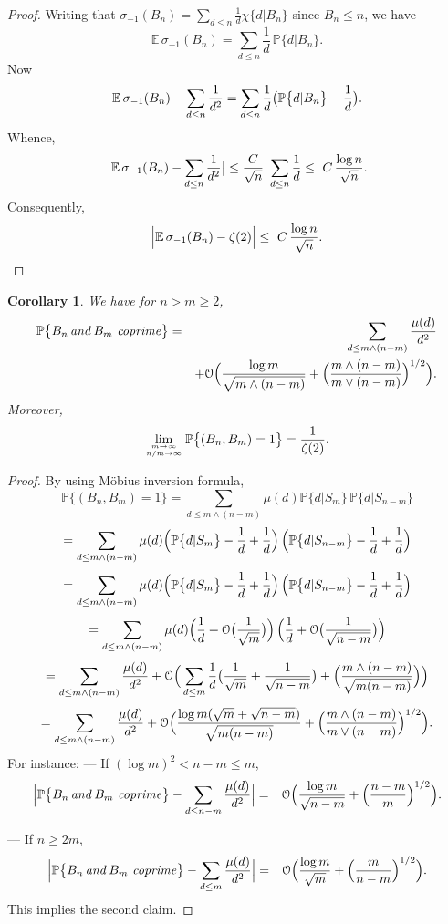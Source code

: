 \documentclass[11pt,draft,reqno]{amsart}
\newtheorem{corollary}[theorem]{Corollary}
\theoremstyle{definition}
\theoremstyle{remarks}
\numberwithin{equation}{section}
\def \m{{\mu}}
\def \s{{\sigma}}
\def\P{{\mathcal P}}
\def\E{{\mathbb E \,}}
\def\P{{\mathbb P}}
\begin{document}
\begin{proof}Writing that $\s_{-1}(B_n)=\sum_{d\le n }\frac{1}{d}\chi\{d|B_n\}$ since $B_n\le n$, we have 
$$  \E \s_{-1}(B_n)= \sum_{d\le n }\frac{1}{d}\,\P\{d|B_n\}.  $$
Now $$\E \s_{-1}(B_n)- \sum_{d\le n}{1\over d^2}=
\sum_{d\le n}{1\over d}\big( \P\big\{d|B_n\big\}  - {1\over d }\big). $$
Whence,
$$\big|\E \s_{-1}(B_n)- \sum_{d\le n}{1\over d^2}\big|\le
{C \over\sqrt n}\ \sum_{d\le n}{1\over d}\le\  C\,{  \log n\over\sqrt n} .$$
Consequently,
  $$\Big|\E \s_{-1}(B_n)-   \zeta(2) \Big| \le\  C\,{  \log n\over\sqrt n} .$$
\end{proof}
\begin{corollary} We have for $n>m\ge 2$,
\begin{eqnarray*} \P\big\{  B_n\,{\it and}\, B_m \ {\it coprime} \big\}  &=&\sum_{d\le m\wedge (n-m)} {\m(d)\over d^2}\cr & &+\mathcal O\Big(   {\log m \over  \sqrt{m\wedge (n-m)}} +\Big({m\wedge (n-m)\over m\vee (n-m)}\Big)^{1/2}\Big).
\end{eqnarray*}
Moreover,
$$\lim_{m\to\infty\atop  {n }/{m} \to\infty}\P\big\{ (B_n,B_m)=1\big\}
 =\frac{1}{\zeta(2)}
 .$$
 \end{corollary}
 \begin{proof} By using M\"obius inversion formula,
$$\P\big\{ (B_n,B_m)=1\big\} =\sum_{d\le 
m\wedge (n-m)}\m(d)\P\{d|S_m\}\,\P\{d|S_{n-m}\}$$
$$=\sum_{d\le m\wedge (n-m)}\m(d)\Big(\P\big\{d|S_m\big\}-{1\over d}+{1\over d}\Big)\,\Big(\P\big\{d|S_{n-m}\big\}-{1\over d}+{1\over d}\Big) $$
$$=\sum_{d\le m\wedge (n-m)}\m(d)\Big(\P\big\{d|S_m\big\}-{1\over d}+{1\over d}\Big)\,\Big(\P\big\{d|S_{n-m}\big\}-{1\over d}+{1\over d}\Big) $$
$$=\sum_{d\le m\wedge (n-m)}\m(d)\Big( {1\over d}+\mathcal O\big({ 1\over\sqrt m}\big)\Big)\, \Big({1\over d}+\mathcal O\big({ 1\over\sqrt {n-m}}\big)\Big) $$
$$=\sum_{d\le m\wedge (n-m)} {\m(d)\over d^2}+\mathcal O\Big(\sum_{d\le m}
{1\over d }\big({1\over  \sqrt{ m}}+{1\over  \sqrt{ n-m}}\big)+\Big({m\wedge (n-m)\over \sqrt{m( n-m)}}\Big)\Big)$$
$$=\sum_{d\le m\wedge (n-m)} {\m(d)\over d^2}+\mathcal O\Big(   {\log m(\sqrt m+\sqrt{ n-m} )\over  \sqrt{ m(n-m)}} +\Big({m\wedge (n-m)\over m\vee (n-m)}\Big)^{1/2}\Big).$$
For instance: 
\vskip 2pt --- If  $(\log m)^2<n-m\le m$, 
\begin{eqnarray*} \Big|\P\big\{  B_n\,{\it and}\, B_m \ {\it coprime} \big\}  -\sum_{d\le  n-m } {\m(d)\over d^2}\Big|  & = & \mathcal O\Big(   {\log m \over  \sqrt{ n-m }} +\Big({ n-m\over m }\Big)^{1/2}\Big).
\end{eqnarray*}

--- If  $n\ge 2m$,  
\begin{eqnarray*} \Big|\P\big\{  B_n\,{\it and}\, B_m \ {\it coprime} \big\}  -\sum_{d\le m  } {\m(d)\over d^2}\Big|  & = & \mathcal O\Big(   {\log m \over  \sqrt{  m }} +\Big({  m\over n-m }\Big)^{1/2}\Big).
\end{eqnarray*}
This implies the second claim.\end{proof}
 
\end{document}
